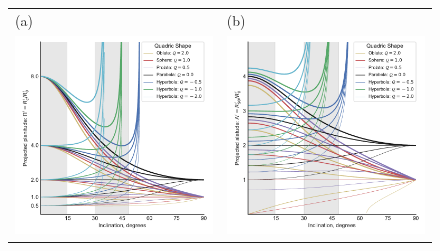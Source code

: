 \begin{figure}
  \centering
  \begin{tabular}{@{}ll@{}}
    (a) & (b) \\
    \includegraphics{figs/projected-Rc-vs-i}
        & \includegraphics{figs/projected-R90-vs-i}

\end{tabular}
\end{figure}

